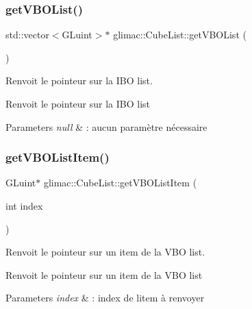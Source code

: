 \subsubsection{\texorpdfstring{get\+V\+B\+O\+List()}{getVBOList()}}
{\footnotesize\ttfamily std\+::vector$<$G\+Luint$>$$\ast$ glimac\+::\+Cube\+List\+::get\+V\+B\+O\+List (\begin{DoxyParamCaption}{ }\end{DoxyParamCaption})\hspace{0.3cm}{\ttfamily [inline]}}



Renvoit le pointeur sur la I\+BO list. 

Renvoit le pointeur sur la I\+BO list


\begin{DoxyParams}{Parameters}
{\em null} & \+: aucun paramètre nécessaire \\
\hline
\end{DoxyParams}
\mbox{\label{classglimac_1_1CubeList_a33f8d08aac4744c18d18969b0b16517c}} 
\subsubsection{\texorpdfstring{get\+V\+B\+O\+List\+Item()}{getVBOListItem()}}
{\footnotesize\ttfamily G\+Luint$\ast$ glimac\+::\+Cube\+List\+::get\+V\+B\+O\+List\+Item (\begin{DoxyParamCaption}\item[{int}]{index }\end{DoxyParamCaption})\hspace{0.3cm}{\ttfamily [inline]}}



Renvoit le pointeur sur un item de la V\+BO list. 

Renvoit le pointeur sur un item de la V\+BO list


\begin{DoxyParams}{Parameters}
{\em index} & \+: index de l\textquotesingle{}item à renvoyer \\
\hline
\end{DoxyParams}
\mbox{\label{classglimac_1_1CubeList_a540ce314986990e41f51dfeafdb5fede}} 
